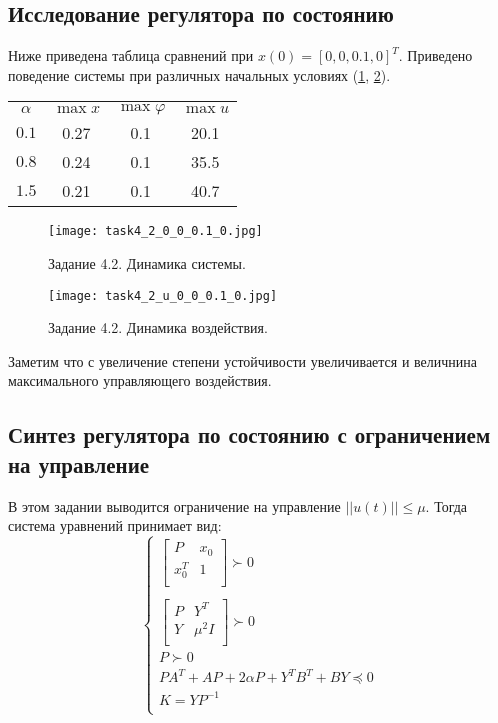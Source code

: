 \subsection{Исследование регулятора по состоянию}
Ниже приведена таблица сравнений при \(x(0) = [0, 0, 0.1, 0]^T\). Приведено поведение системы при различных начальных условиях (\ref{fig:task4_2_1}, \ref{fig:task4_2_2}).
\begin{center}
    \begin{tabular}{ c | c c c }
$\alpha$ & $\max x$ & $\max \varphi$ & $\max u$ \\
        $0.1$ & 0.27 & 0.1 & 20.1 \\
        $0.8$ & 0.24 & 0.1 & 35.5 \\
        $1.5$ & 0.21 & 0.1 & 40.7 \\
    \end{tabular}
\end{center}

\begin{figure}[]
    \centering
    \texttt{[image: task4\_2\_0\_0\_0.1\_0.jpg]}
    \caption{Задание 4.2. Динамика системы.}
    \label{fig:task4_2_1}
\end{figure}
\begin{figure}[]
    \centering
    \texttt{[image: task4\_2\_u\_0\_0\_0.1\_0.jpg]}
    \caption{Задание 4.2. Динамика воздействия.}
    \label{fig:task4_2_2}
\end{figure}

Заметим что с увеличение степени устойчивости увеличивается и величнина максимального управляющего воздействия.


\subsection{Синтез регулятора по состоянию с ограничением на управление}

В этом задании выводится ограничение на управление \(||u(t)|| \leq \mu\). Тогда система уравнений принимает вид: 
\[
        \begin{cases}
                \begin{bmatrix}
                    P &  x_0\\
                    x_0^T &  1 \\
                \end{bmatrix} \succ 0 \\
                \\
                \begin{bmatrix}
                    P &  Y^T\\
                    Y &  \mu^2I \\
                \end{bmatrix} \succ 0 \\
                P \succ 0 \\
                PA^T + AP + 2 \alpha P + Y^T B^T + BY \preccurlyeq 0  \\
                K = YP^{-1}\\
        \end{cases} 
\]

